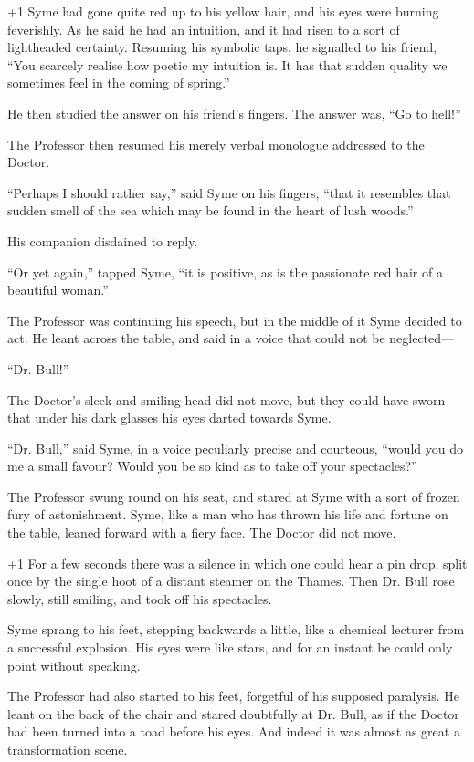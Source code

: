 \looseness+1
Syme had gone quite red up to his yellow hair, and his eyes were burning feverishly. As he said he had an intuition, and it had risen to a sort of lightheaded certainty. Resuming his symbolic taps, he signalled to his friend, “You scarcely realise how poetic my intuition is. It has that sudden quality we sometimes feel in the coming of spring.”

He then studied the answer on his friend’s fingers. The answer was, “Go to hell!”

The Professor then resumed his merely verbal monologue addressed to the Doctor.

“Perhaps I should rather say,” said Syme on his fingers, “that it resembles that sudden smell of the sea which may be found in the heart of lush woods.”

His companion disdained to reply.

“Or yet again,” tapped Syme, “it is positive, as is the passionate red hair of a beautiful woman.”

The Professor was continuing his speech, but in the middle of it Syme decided to act. He leant across the table, and said in a voice that could not be neglected⁠—

“Dr. Bull!”

The Doctor’s sleek and smiling head did not move, but they could have sworn that under his dark glasses his eyes darted towards Syme.

“Dr. Bull,” said Syme, in a voice peculiarly precise and courteous, “would you do me a small favour? Would you be so kind as to take off your spectacles?”

The Professor swung round on his seat, and stared at Syme with a sort of frozen fury of astonishment. Syme, like a man who has thrown his life and fortune on the table, leaned forward with a fiery face. The Doctor did not move.

\looseness+1
For a few seconds there was a silence in which one could hear a pin drop, split once by the single hoot of a distant steamer on the Thames. Then Dr. Bull rose slowly, still smiling, and took off his spectacles.

Syme sprang to his feet, stepping backwards a little, like a chemical lecturer from a successful explosion. His eyes were like stars, and for an instant he could only point without speaking.

The Professor had also started to his feet, forgetful of his supposed paralysis. He leant on the back of the chair and stared doubtfully at Dr. Bull, as if the Doctor had been turned into a toad before his eyes. And indeed it was almost as great a transformation scene.

